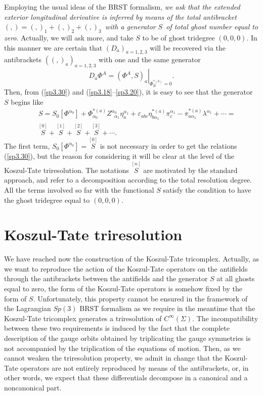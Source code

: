 \documentclass[a4paper,12pt]{article}
\begin{document}
Employing the usual ideas of the BRST formalism, \textit{we ask that the
extended exterior longitudinal derivative is inferred by means of the total
antibracket }$\left( ,\right) =\left( ,\right) _{1}+\left( ,\right)
_{2}+\left( ,\right) _{3}$\textit{\ with a generator }$S$\textit{\ of total
ghost number equal to zero}. Actually, we will ask more, and take $S$ to be
of ghost tridegree $\left( 0,0,0\right) $. In this manner we are certain
that $\left( D_{a}\right) _{a=1,2,3}$ will be recovered via the antibrackets 
$\left( \left( ,\right) _{a}\right) _{a=1,2,3}$ with one and the same
generator 
\begin{equation}
D_{a}\Phi ^{A}=\left. \left( \Phi ^{A},S\right) _{a}\right| _{\Phi
_{B}^{*(b)}=0}.  \label{sp3.30}
\end{equation}
Then, from (\ref{sp3.30}) and (\ref{sp3.18}--\ref{sp3.20}), it is easy to
see that the generator $S$ begins like 
\begin{eqnarray}
&&S=S_{0}\left[ \Phi ^{\alpha _{0}}\right] +\Phi _{\alpha
_{0}}^{*(a)}Z_{\;\;\alpha _{1}}^{\alpha _{0}}\eta _{a}^{\alpha
_{1}}+\varepsilon _{abc}\eta _{b\alpha _{1}}^{*(a)}\pi _{c}^{\alpha
_{1}}-\pi _{a\alpha _{1}}^{*(a)}\lambda ^{\alpha _{1}}+\cdots =  \nonumber \\
&&\stackrel{[0]}{S}+\stackrel{[1]}{S}+\stackrel{[2]}{S}+\stackrel{[3]}{S}%
+\cdots .  \label{sp3.31}
\end{eqnarray}
The first term, $S_{0}\left[ \Phi ^{\alpha _{0}}\right] =\stackrel{[0]}{S}$
is not necessary in order to get the relations (\ref{sp3.30}), but the
reason for considering it will be clear at the level of the Koszul-Tate
triresolution. The notations $\stackrel{[n]}{S}$ are motivated by the
standard approach, and refer to a decomposition according to the total
resolution degree. All the terms involved so far with the functional $S$
satisfy the condition to have the ghost tridegree equal to $\left(
0,0,0\right) $.

\section{Koszul-Tate triresolution}

We have reached now the construction of the Koszul-Tate tricomplex.
Actually, as we want to reproduce the action of the Koszul-Tate operators on
the antifields through the antibrackets between the antifields and the
generator $S$ at all ghosts equal to zero, the form of the Koszul-Tate
operators is somehow fixed by the form of $S$. Unfortunately, this property
cannot be ensured in the framework of the Lagrangian $Sp(3)$ BRST formalism
as we require in the meantime that the Koszul-Tate tricomplex generates a
triresolution of $C^{\infty }\left( \Sigma \right) $. The incompatibility
between these two requirements is induced by the fact that the complete
description of the gauge orbits obtained by triplicating the gauge
symmetries is not accompanied by the triplication of the equations of
motion. Then, as we cannot weaken the triresolution property, we admit in
change that the Koszul-Tate operators are not entirely reproduced by means
of the antibrackets, or, in other words, we expect that these differentials
decompose in a canonical and a noncanonical part.
\end{document}
